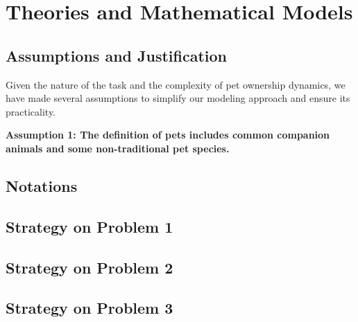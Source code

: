 \section{Theories and Mathematical Models}


\subsection{Assumptions and Justification}
Given the nature of the task and the complexity of pet ownership dynamics, we have made several assumptions to simplify our modeling approach and ensure its practicality.

\textbf{Assumption 1: The definition of pets includes common companion animals and some non-traditional pet species.}

\subsection{Notations}

\subsection{Strategy on Problem 1}

\subsection{Strategy on Problem 2}

\subsection{Strategy on Problem 3}
